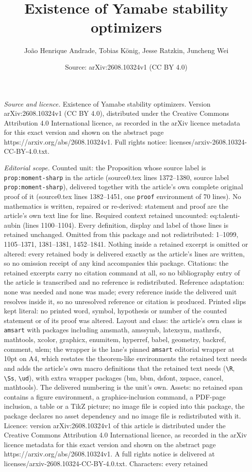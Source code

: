 \documentclass[10pt,a4paper]{amsart}
\title[Existence of Yamabe stability optimizers]{Existence of Yamabe stability optimizers}
\author{Jo\~ao Henrique Andrade, Tobias K\"onig, Jesse Ratzkin, Juncheng Wei}
\date{Source: arXiv:2608.10324v1 (CC BY 4.0)}
\begin{document}
\maketitle

\noindent\emph{Source and licence.} Existence of Yamabe stability optimizers. Version arXiv:2608.10324v1 (CC BY 4.0), distributed under the Creative Commons Attribution 4.0 International licence, as recorded in the arXiv licence metadata for this exact version and shown on the abstract page https://arxiv.org/abs/2608.10324v1. Full rights notice: licenses/arxiv-2608.10324-CC-BY-4.0.txt.\par\smallskip

\noindent\textit{Editorial scope.} Counted unit: the Proposition whose source label is \texttt{prop:moment-sharp} in the article (source0.tex lines 1372--1380, source label \texttt{prop:moment-sharp}), delivered together with the article's own complete original proof of it (source0.tex lines 1382--1451, one \texttt{proof} environment of 70 lines). No mathematics is written, repaired or re-derived: statement and proof are the article's own text line for line. Required context retained uncounted: eq:talenti-aubin (lines 1100--1104). Every definition, display and label of those lines is retained unchanged. Omitted from this package and not redistributed: 1--1099, 1105--1371, 1381--1381, 1452--1841. Nothing inside a retained excerpt is omitted or altered: every retained body is delivered exactly as the article's lines are written, so no omission receipt of any kind accompanies this package. Citations: the retained excerpts carry no citation command at all, so no bibliography entry of the article is transcribed and no reference is redistributed. Reference adaptation: none was needed and none was made; every reference inside the delivered unit resolves inside it, so no unresolved reference or citation is produced. Printed slips kept literal: no printed word, symbol, hypothesis or number of the counted statement or of its proof was altered. Layout and class: the article's own class is \texttt{amsart} with packages including amsmath, amssymb, latexsym, mathrsfs, mathtools, xcolor, graphicx, enumitem, hyperref, babel, geometry, backref, comment, ulem; the wrapper is the lane's pinned \texttt{amsart} editorial wrapper at 10pt on A4, which restates the theorem-like environments the retained text needs and adds the article's own macro definitions that the retained text needs (\texttt{\textbackslash R}, \texttt{\textbackslash Ss}, \texttt{\textbackslash ud}), with extra wrapper packages (bm, bbm, dsfont, xspace, cancel, mathtools). The delivered numbering is the unit's own. Assets: no retained span contains a figure environment, a graphics-inclusion command, a PDF-page inclusion, a table or a TikZ picture; no image file is copied into this package, the package declares no asset dependency and no image file is redistributed with it. Licence: version arXiv:2608.10324v1 of this article is distributed under the Creative Commons Attribution 4.0 International licence, as recorded in the arXiv licence metadata for this exact version and shown on the abstract page https://arxiv.org/abs/2608.10324v1. A full rights notice is delivered at licenses/arxiv-2608.10324-CC-BY-4.0.txt. Characters: every retained 
\end{document}
